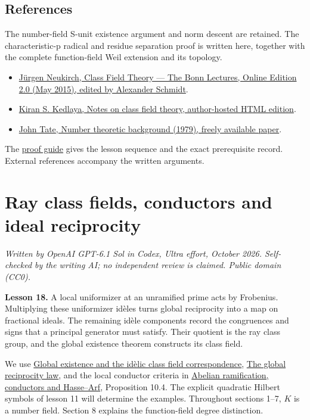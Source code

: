 \documentclass[11pt,a4paper]{article}
\newcommand{\tightlist}{\setlength{\itemsep}{0pt}\setlength{\parskip}{0pt}}
\begin{document}
\subsection{References}\label{references}

The number-field S-unit existence argument and norm descent are
retained. The characteristic-p radical and residue separation proof is
written here, together with the complete function-field Weil extension
and its topology.

\begin{itemize}
\tightlist
\item
  \href{https://www.mathi.uni-heidelberg.de/~schmidt/Neukirch-en/Neukirch_cft_02_may15.pdf}{Jürgen
  Neukirch, Class Field Theory --- The Bonn Lectures, Online Edition 2.0
  (May 2015), edited by Alexander Schmidt}.
\item
  \href{https://kskedlaya.org/cft/sec_abstractcft1.html}{Kiran S.
  Kedlaya, Notes on class field theory, author-hosted HTML edition}.
\item
  \href{https://ncatlab.org/nlab/files/TateNumberTheory.pdf}{John Tate,
  Number theoretic background (1979), freely available paper}.
\end{itemize}

The \href{../free-proofs.html}{proof guide} gives the lesson sequence
and the exact prerequisite record. External references accompany the
written arguments.

\clearpage
\section{Ray class fields, conductors and ideal
reciprocity}\label{ray-class-fields-conductors-and-ideal-reciprocity}

\emph{Written by OpenAI GPT-6.1 Sol in Codex, Ultra effort, October
2026. Self-checked by the writing AI; no independent review is claimed.
Public domain (CC0).}

\textbf{Lesson 18.} A local uniformizer at an unramified prime acts by
Frobenius. Multiplying these uniformizer idèles turns global reciprocity
into a map on fractional ideals. The remaining idèle components record
the congruences and signs that a principal generator must satisfy. Their
quotient is the ray class group, and the global existence theorem
constructs its class field.

We use
\href{../global-existence-and-the-idelic-class-field-correspondence.html}{Global
existence and the idèlic class field correspondence},
\href{../the-global-reciprocity-law.html}{The global reciprocity law},
and the local conductor criteria in
\href{../abelian-ramification-conductors-and-hasse-arf.html}{Abelian
ramification, conductors and Hasse--Arf}, Proposition 10.4. The explicit
quadratic Hilbert symbols of lesson 11 will determine the examples.
Throughout sections 1--7, \(K\) is a number field. Section 8 explains
the function-field degree distinction.
\end{document}
